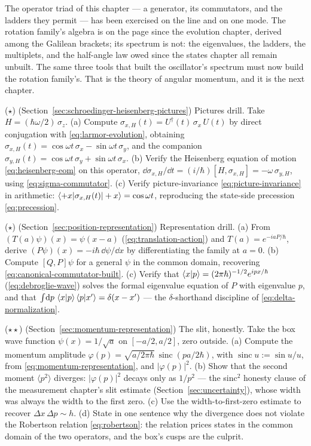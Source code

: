 The operator triad of this chapter --- a generator, its commutators, and the ladders they permit --- has been exercised on the line and on one mode. The rotation family's algebra is on the page since the evolution chapter, derived among the Galilean brackets; its spectrum is not: the eigenvalues, the ladders, the multiplets, and the half-angle law owed since the states chapter all remain unbuilt. The same three tools that built the oscillator's spectrum must now build the rotation family's. That is the theory of angular momentum, and it is the next chapter.

\begin{problemset}
\item ($\star$) (Section~\ref{sec:schroedinger-heisenberg-pictures}) Pictures drill. Take $H = (\hbar\omega/2)\,\sigma_z$. (a) Compute $\sigma_{x,H}(t) = U^\dagger(t)\,\sigma_x\,U(t)$ by direct conjugation with \eqref{eq:larmor-evolution}, obtaining $\sigma_{x,H}(t) = \cos\omega t\,\sigma_x - \sin\omega t\,\sigma_y$, and the companion $\sigma_{y,H}(t) = \cos\omega t\,\sigma_y + \sin\omega t\,\sigma_x$. (b) Verify the Heisenberg equation of motion \eqref{eq:heisenberg-eom} on this operator, $\dd\sigma_{x,H}/\dd t = (i/\hbar)[H, \sigma_{x,H}] = -\omega\,\sigma_{y,H}$, using \eqref{eq:sigma-commutator}. (c) Verify picture-invariance \eqref{eq:picture-invariance} in arithmetic: $\braket{+x|\sigma_{x,H}(t)|+x} = \cos\omega t$, reproducing the state-side precession \eqref{eq:precession}.

\item ($\star$) (Section~\ref{sec:position-representation}) Representation drill. (a) From $(T(a)\psi)(x) = \psi(x - a)$ (\eqref{eq:translation-action}) and $T(a) = e^{-iaP/\hbar}$, derive $(P\psi)(x) = -i\hbar\,\dd\psi/\dd x$ by differentiating the family at $a = 0$. (b) Compute $[Q, P]\psi$ for a general $\psi$ in the common domain, recovering \eqref{eq:canonical-commutator-built}. (c) Verify that $\braket{x|p} = (2\pi\hbar)^{-1/2}e^{ipx/\hbar}$ (\eqref{eq:debroglie-wave}) solves the formal eigenvalue equation of $P$ with eigenvalue $p$, and that $\int\!\mathrm{d} p\,\braket{x|p}\braket{p|x'} = \delta(x - x')$ --- the $\delta$-shorthand discipline of \eqref{eq:delta-normalization}.

\item ($\star\star$) (Section~\ref{sec:momentum-representation}) The slit, honestly. Take the box wave function $\psi(x) = 1/\sqrt{a}$ on $[-a/2, a/2]$, zero outside. (a) Compute the momentum amplitude $\varphi(p) = \sqrt{a/2\pi\hbar}\,\operatorname{sinc}(pa/2\hbar)$, with $\operatorname{sinc} u := \sin u/u$, from \eqref{eq:momentum-representation}, and $|\varphi(p)|^2$. (b) Show that the second moment $\langle p^2\rangle$ diverges: $|\varphi(p)|^2$ decays only as $1/p^2$ --- the sinc$^2$ honesty clause of the measurement chapter's slit estimate (Section~\ref{sec:uncertainty}), whose width was always the width to the first zero. (c) Use the width-to-first-zero estimate to recover $\Delta x\,\Delta p \sim h$. (d) State in one sentence why the divergence does not violate the Robertson relation \eqref{eq:robertson}: the relation prices states in the common domain of the two operators, and the box's cusps are the culprit.


\end{problemset}
